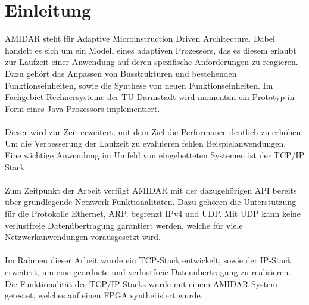 \chapter{Einleitung}

AMIDAR steht für Adaptive Microinstruction Driven Architecture. Dabei handelt es sich um ein Modell eines adaptiven Prozessors, das es diesem erlaubt zur Laufzeit einer Anwendung auf deren spezifische Anforderungen zu reagieren. Dazu gehört das Anpassen von Busstrukturen und bestehenden Funktionseinheiten, sowie die Synthese von neuen Funktionseinheiten.
Im Fachgebiet Rechnersysteme der TU-Darmstadt wird momentan ein Prototyp in Form eines Java-Prozessors implementiert. \\\\
Dieser wird zur Zeit erweitert, mit dem Ziel die Performance deutlich zu erhöhen. Um die Verbesserung der Laufzeit zu evaluieren fehlen Beispielanwendungen. Eine wichtige Anwendung im Umfeld von eingebetteten Systemen ist der TCP/IP Stack.\\\\
Zum Zeitpunkt der Arbeit verfügt AMIDAR mit der dazugehörigen API bereits über grundlegende Netzwerk-Funktionalitäten. Dazu gehören die Unterstützung für die Protokolle Ethernet, ARP, begrenzt IPv4 und UDP. Mit UDP kann keine verlustfreie Datenübertragung garantiert werden, welche für viele Netzwerkanwendungen vorausgesetzt wird.\\\\
Im Rahmen dieser Arbeit wurde ein TCP-Stack entwickelt, sowie der IP-Stack erweitert, um eine geordnete und verlustfreie Datenübertragung zu realisieren. Die Funktionalität des TCP/IP-Stacks wurde mit einem AMIDAR System getestet, welches auf einen FPGA synthetisiert wurde.
